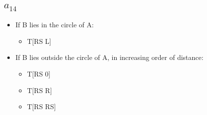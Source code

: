 \documentclass[11pt]{article} %
\begin{document}
\subsection{$a_{14}$}
\begin{itemize}
\item If B lies in the circle of A:
\begin{itemize}
\item T[RS L]
\end{itemize}
\item If B lies outside the circle of A, in increasing order of distance:
\begin{itemize}
\item T[RS 0]
\item T[RS R]
\item T[RS RS]
\end{itemize}
\end{itemize}
\end{document}
